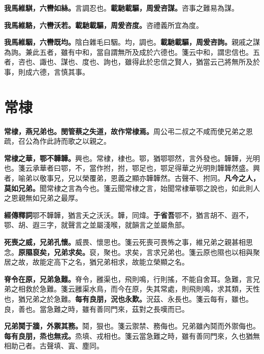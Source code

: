 \textbf{我馬維騏，六轡如絲。}{\footnotesize 言調忍也。}\textbf{載馳載驅，周爰咨謀。}{\footnotesize 咨事之難易為謀。}

\textbf{我馬維駱，六轡沃若。載馳載驅，周爰咨度。}{\footnotesize 咨禮義所宜為度。}

\textbf{我馬維駰，六轡既均。}{\footnotesize 陰白雜毛曰駰。均，調也。}\textbf{載馳載驅，周爰咨詢。}{\footnotesize 親戚之謀為詢。兼此五者，雖有中和，當自謂無所及成於六德也。箋云中和，謂忠信也。五者，咨也、諏也、謀也、度也、詢也，雖得此於忠信之賢人，猶當云己將無所及於事，則成六德，言慎其事。}

\section{常棣}


\textbf{常棣，燕兄弟也。閔管蔡之失道，故作常棣焉。}{\footnotesize 周公弔二叔之不咸而使兄弟之恩疏，召公為作此詩而歌之以親之。}

\textbf{常棣之華，鄂不韡韡。}{\footnotesize 興也。常棣，棣也。鄂，猶鄂鄂然，言外發也。韡韡，光明也。箋云承華者曰鄂，不，當作拊，拊，鄂足也，鄂足得華之光明則韡韡然盛。興者，喻弟以敬事兄，兄以榮覆弟，恩義之顯亦韡韡然。古聲不、拊同。}\textbf{凡今之人，莫如兄弟。}{\footnotesize 聞常棣之言為今也。箋云聞常棣之言，始聞常棣華鄂之說也，如此則人之恩親無如兄弟之最厚。}

\begin{quoting}\textbf{經傳釋詞}鄂不韡韡，猶言夭之沃沃。韡，同煒。\textbf{于省吾}鄂不，猶言胡不、遐不，鄂、胡、遐三字，就聲言之並屬淺喉，就韻言之並屬魚部。\end{quoting}

\textbf{死喪之威，兄弟孔懷。}{\footnotesize 威畏、懷思也。箋云死喪可畏怖之事，維兄弟之親甚相思念。}\textbf{原隰裒矣，兄弟求矣。}{\footnotesize 裒，聚也。求矣，言求兄弟也。箋云原也隰也以相與聚居之故，故能定高下之名，猶兄弟相求，故能立榮顯之名。}

\textbf{脊令在原，兄弟急難。}{\footnotesize 脊令，雝渠也，飛則鳴，行則搖，不能自舍耳。急難，言兄弟之相救於急難。箋云雝渠水鳥，而今在原，失其常處，則飛則鳴，求其類，天性也，猶兄弟之於急難。}\textbf{每有良朋，況也永歎。}{\footnotesize 況茲、永長也。箋云每有，雖也。良，善也。當急難之時，雖有善同門來，茲對之長嘆而已。}

\textbf{兄弟鬩于牆，外禦其務。}{\footnotesize 鬩，狠也。箋云禦禁、務侮也。兄弟雖內鬩而外禦侮也。}\textbf{每有良朋，烝也無戎。}{\footnotesize 烝填、戎相也。箋云當急難之時，雖有善同門來，久也猶無相助己者。古聲填、寘、塵同。}

